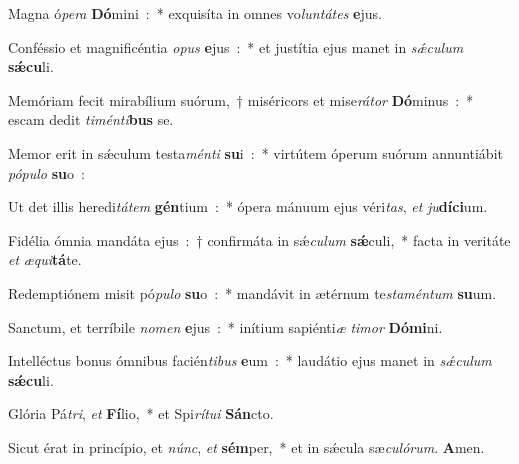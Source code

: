 ﻿\item Magna ó\emph{pe}\-\emph{ra} \textbf{Dó}\-mini~:~* exquisíta in omnes vo\emph{lun}\-\emph{tá}\-\emph{tes} \textbf{e}jus.
\item Conféssio et magnificéntia \emph{o}\-\emph{pus} \textbf{e}jus~:~* et justítia ejus manet in \emph{sǽ}\-\emph{cu}\-\emph{lum} \textbf{sǽ}\textbf{cu}li.
\item Memóriam fecit mirabílium suórum,~† miséricors et mise\emph{rá}\-\emph{tor} \textbf{Dó}\-minus~:~* escam dedit \emph{ti}\-\emph{mén}\-\emph{ti}\-\textbf{bus} se.
\item Memor erit in sǽculum testa\emph{mén}\-\emph{ti} \textbf{su}\-i~:~* virtútem óperum suórum annuntiábit \emph{pó}\-\emph{pu}\-\emph{lo} \textbf{su}o~:
\item Ut det illis heredi\emph{tá}\-\emph{tem} \textbf{gén}\-tium~:~* ópera mánuum ejus véri\emph{tas}, \emph{et} \emph{ju}\textbf{dí}\textbf{ci}um.
\item Fidélia ómnia mandáta ejus~:~† confirmáta in sǽ\emph{cu}\-\emph{lum} \textbf{sǽ}\-culi,~* facta in veritáte \emph{et} \emph{æ}\emph{qui}\textbf{tá}te.
\item Redemptiónem misit pó\emph{pu}\-\emph{lo} \textbf{su}\-o~:~* mandávit in ætérnum te\emph{sta}\-\emph{mén}\-\emph{tum} \textbf{su}um.
\item Sanctum, et terríbile \emph{no}\-\emph{men} \textbf{e}jus~:~* inítium sapiénti\emph{æ} \emph{ti}\-\emph{mor} \textbf{Dó}\textbf{mi}ni.
\item Intelléctus bonus ómnibus facién\emph{ti}\-\emph{bus} \textbf{e}\-um~:~* laudátio ejus manet in \emph{sǽ}\-\emph{cu}\-\emph{lum} \textbf{sǽ}\textbf{cu}li.
\item Glória Pá\emph{tri}, \emph{et} \textbf{Fí}\-lio,~* et Spi\emph{rí}\-\emph{tu}\-\emph{i} \textbf{Sán}cto.
\item Sicut érat in princípio, et \emph{núnc}, \emph{et} \textbf{sém}\-per,~* et in sǽcula sæ\emph{cu}\-\emph{ló}\-\emph{rum}. \textbf{A}men.